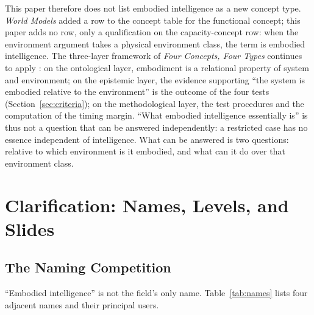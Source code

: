 \documentclass[10pt]{article}
\begin{document}
This paper therefore does not list embodied intelligence as a new concept type. \textit{World Models} added a row to the concept table for the functional concept; this paper adds no row, only a qualification on the capacity-concept row: when the environment argument takes a physical environment class, the term is embodied intelligence. The three-layer framework of \textit{Four Concepts, Four Types} continues to apply \cite{yu2026four}: on the ontological layer, embodiment is a relational property of system and environment; on the epistemic layer, the evidence supporting ``the system is embodied relative to the environment'' is the outcome of the four tests (Section~\ref{sec:criteria}); on the methodological layer, the test procedures and the computation of the timing margin. ``What embodied intelligence essentially is'' is thus not a question that can be answered independently: a restricted case has no essence independent of intelligence. What can be answered is two questions: relative to which environment is it embodied, and what can it do over that environment class.

\section{Clarification: Names, Levels, and Slides}\label{sec:clarify}

\subsection{The Naming Competition}\label{sec:naming}

``Embodied intelligence'' is not the field's only name. Table~\ref{tab:names} lists four adjacent names and their principal users.
\end{document}
